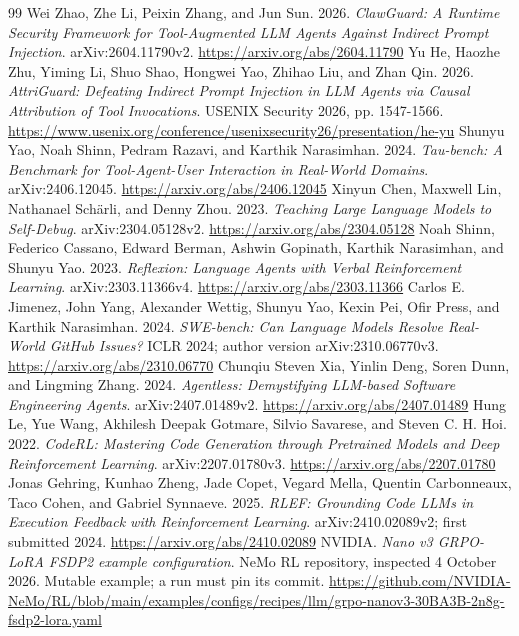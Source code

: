 \documentclass[11pt,a4paper]{article}
\begin{document}
\begin{thebibliography}{99}
 Wei Zhao, Zhe Li, Peixin Zhang, and Jun Sun. 2026. \emph{ClawGuard: A Runtime Security Framework for Tool-Augmented LLM Agents Against Indirect Prompt Injection}. arXiv:2604.11790v2. \url{https://arxiv.org/abs/2604.11790}
 Yu He, Haozhe Zhu, Yiming Li, Shuo Shao, Hongwei Yao, Zhihao Liu, and Zhan Qin. 2026. \emph{AttriGuard: Defeating Indirect Prompt Injection in LLM Agents via Causal Attribution of Tool Invocations}. USENIX Security 2026, pp. 1547-1566. \url{https://www.usenix.org/conference/usenixsecurity26/presentation/he-yu}
 Shunyu Yao, Noah Shinn, Pedram Razavi, and Karthik Narasimhan. 2024. \emph{Tau-bench: A Benchmark for Tool-Agent-User Interaction in Real-World Domains}. arXiv:2406.12045. \url{https://arxiv.org/abs/2406.12045}
 Xinyun Chen, Maxwell Lin, Nathanael Sch\"{a}rli, and Denny Zhou. 2023. \emph{Teaching Large Language Models to Self-Debug}. arXiv:2304.05128v2. \url{https://arxiv.org/abs/2304.05128}
 Noah Shinn, Federico Cassano, Edward Berman, Ashwin Gopinath, Karthik Narasimhan, and Shunyu Yao. 2023. \emph{Reflexion: Language Agents with Verbal Reinforcement Learning}. arXiv:2303.11366v4. \url{https://arxiv.org/abs/2303.11366}
 Carlos E. Jimenez, John Yang, Alexander Wettig, Shunyu Yao, Kexin Pei, Ofir Press, and Karthik Narasimhan. 2024. \emph{SWE-bench: Can Language Models Resolve Real-World GitHub Issues?} ICLR 2024; author version arXiv:2310.06770v3. \url{https://arxiv.org/abs/2310.06770}
 Chunqiu Steven Xia, Yinlin Deng, Soren Dunn, and Lingming Zhang. 2024. \emph{Agentless: Demystifying LLM-based Software Engineering Agents}. arXiv:2407.01489v2. \url{https://arxiv.org/abs/2407.01489}
 Hung Le, Yue Wang, Akhilesh Deepak Gotmare, Silvio Savarese, and Steven C. H. Hoi. 2022. \emph{CodeRL: Mastering Code Generation through Pretrained Models and Deep Reinforcement Learning}. arXiv:2207.01780v3. \url{https://arxiv.org/abs/2207.01780}
 Jonas Gehring, Kunhao Zheng, Jade Copet, Vegard Mella, Quentin Carbonneaux, Taco Cohen, and Gabriel Synnaeve. 2025. \emph{RLEF: Grounding Code LLMs in Execution Feedback with Reinforcement Learning}. arXiv:2410.02089v2; first submitted 2024. \url{https://arxiv.org/abs/2410.02089}
 NVIDIA. \emph{Nano v3 GRPO-LoRA FSDP2 example configuration}. NeMo RL repository, inspected 4 October 2026. Mutable example; a run must pin its commit. \url{https://github.com/NVIDIA-NeMo/RL/blob/main/examples/configs/recipes/llm/grpo-nanov3-30BA3B-2n8g-fsdp2-lora.yaml}
\end{thebibliography}
\end{document}
